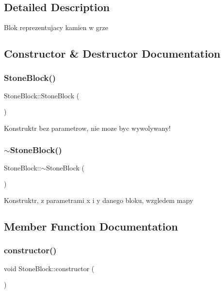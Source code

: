\subsection{Detailed Description}
Blok reprezentujacy kamien w grze 

\subsection{Constructor \& Destructor Documentation}
\mbox{\label{class_stone_block_ac1118014793321dd453371c33f26aa0f}} 
\subsubsection{\texorpdfstring{Stone\+Block()}{StoneBlock()}}
{\footnotesize\ttfamily Stone\+Block\+::\+Stone\+Block (\begin{DoxyParamCaption}{ }\end{DoxyParamCaption})}

Konstruktr bez parametrow, nie moze byc wywolywany! \mbox{\label{class_stone_block_a7a44a5fbed028ac94c49c40646477a03}} 
\subsubsection{\texorpdfstring{$\sim$\+Stone\+Block()}{~StoneBlock()}}
{\footnotesize\ttfamily Stone\+Block\+::$\sim$\+Stone\+Block (\begin{DoxyParamCaption}{ }\end{DoxyParamCaption})}

Konstruktr, z parametrami x i y danego bloku, wzgledem mapy 

\subsection{Member Function Documentation}
\mbox{\label{class_stone_block_a391e99e613d1864c93647f60c9455a74}} 
\subsubsection{\texorpdfstring{constructor()}{constructor()}}
{\footnotesize\ttfamily void Stone\+Block\+::constructor (\begin{DoxyParamCaption}{ }\end{DoxyParamCaption})}

